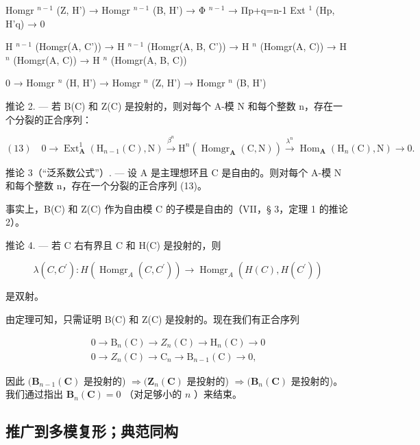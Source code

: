 Homgr \(^{n-1}\) (Z, H') → Homgr \(^{n-1}\) (B, H') → Φ \(^{n-1}\) → Πp+q=n-1 Ext \(^{1}\) (Hp, H'q) → 0

H \(^{n-1}\) (Homgr(A, C')) → H \(^{n-1}\) (Homgr(A, B, C')) → H \(^{n}\) (Homgr(A, C)) → H \(^{n}\) (Homgr(A, C)) → H \(^{n}\) (Homgr(A, B, C))

0 → Homgr \(^{n}\) (H, H') → Homgr \(^{n}\) (Z, H') → Homgr \(^{n}\) (B, H')

推论 2. --- 若 B(C) 和 Z(C) 是投射的，则对每个 A-模 N 和每个整数 n，存在一个分裂的正合序列：

\[
(1 3) \quad 0 \longrightarrow \operatorname{Ext} _ {\mathbf {A}} ^ {1} \left(\mathrm{H} _ {n - 1} (\mathrm{C}), \mathrm{N}\right) \xrightarrow {\beta^ {n}} \mathrm{H} ^ {n} \left(\operatorname{Homgr} _ {\mathbf {A}} (\mathrm{C}, \mathrm{N})\right) \xrightarrow {\lambda^ {n}} \operatorname{Hom} _ {\mathbf {A}} \left(\mathrm{H} _ {n} (\mathrm{C}), \mathrm{N}\right) \longrightarrow 0.
\]

推论 3（“泛系数公式”）. --- 设 A 是主理想环且 C 是自由的。则对每个 A-模 N 和每个整数 n，存在一个分裂的正合序列 (13)。

事实上，B(C) 和 Z(C) 作为自由模 C 的子模是自由的（VII，§ 3，定理 1 的推论 2）。

推论 4. --- 若 C 右有界且 C 和 H(C) 是投射的，则

\[
\lambda (C, C ^ {\prime}): H \left(\operatorname{Homgr} _ {A} (C, C ^ {\prime})\right)\rightarrow \operatorname{Homgr} _ {A} \left(H (C), H \left(C ^ {\prime}\right)\right)
\]

是双射。

由定理可知，只需证明 B(C) 和 Z(C) 是投射的。现在我们有正合序列

\[
\begin{array}{l} 0 \to \mathrm{B} _ {n} (\mathrm{C}) \to Z _ {n} (\mathrm{C}) \to \mathrm{H} _ {n} (\mathrm{C}) \to 0 \\ 0 \to Z _ {n} (\mathrm{C}) \to \mathrm{C} _ {n} \to \mathrm{B} _ {n - 1} (\mathrm{C}) \to 0, \end{array}
\]

因此 \((\mathbf{B}_{n - 1}(\mathbf{C})\) 是投射的) \(\Rightarrow (\mathbf{Z}_n(\mathbf{C})\) 是投射的) \(\Rightarrow (\mathbf{B}_n(\mathbf{C})\) 是投射的)。我们通过指出 \(\mathbf{B}_n(\mathbf{C}) = 0\) （对足够小的 \(n\) ）来结束。

\subsection{推广到多模复形；典范同构}

